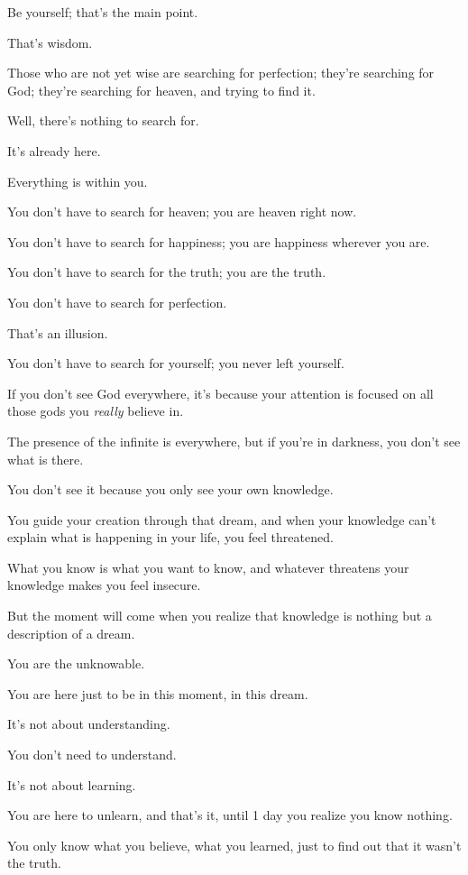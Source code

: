 \documentclass{article}
\numberwithin{equation}{section}
\begin{document}
Be yourself; that's the main point.

That's wisdom.

%
Those who are not yet wise are searching for perfection; they're searching for God; they're searching for heaven, and trying to find it.

Well, there's nothing to search for.

It's already here.

Everything is within you.

You don't have to search for heaven; you are heaven right now.

You don't have to search for happiness; you are happiness wherever you are.

You don't have to search for the truth; you are the truth.

You don't have to search for perfection.

That's an illusion.

You don't have to search for yourself; you never left yourself.

If you don't see God everywhere, it's because your attention is focused on all those gods you \textit{really} believe in.

%
The presence of the infinite is everywhere, but if you're in darkness, you don't see what is there.

You don't see it because you only see your own knowledge.

You guide your creation through that dream, and when your knowledge can't explain what is happening in your life, you feel threatened.

What you know is what you want to know, and whatever threatens your knowledge makes you feel insecure.

But the moment will come when you realize that knowledge is nothing but a description of a dream.

%
You are the unknowable.

You are here just to be in this moment, in this dream.


It's not about understanding.

You don't need to understand.

It's not about learning.

You are here to unlearn, and that's it, until 1 day you realize you know nothing.

You only know what you believe, what you learned, just to find out that it wasn't the truth.
\end{document}
